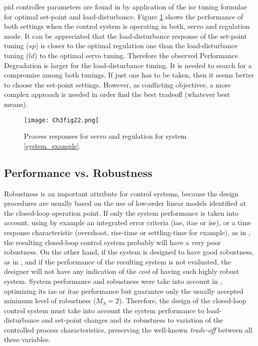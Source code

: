 \gls{pid} controller parameters are found in \citet{zhuang1993} by application of the \gls{ise} tuning formulae for optimal set-point and load-disturbance. Figure \ref{ch3:fig:example1} shows the performance of both settings when the control system is operating in both, servo and regulation mode. It can be appreciated that the load-disturbance response of the set-point tuning ($sp$) is closer to the optimal regulation one than the load-disturbance tuning ($ld$) to the optimal servo tuning. Therefore the observed Performance Degradation is larger for the load-disturbance tuning. It is needed to search for a compromise among both tunings. If just one has to be taken, then it seems better to choose the set-point settings. However, as conflicting objectives, a more complex approach is needed in order find the best tradeoff (whatever best means).
%
\begin{figure}[tb]
    \begin{center}
        \texttt{[image: Ch3fig22.png]}
        \caption{Process responses for servo and regulation for system \ref{system_example}.}
        \label{ch3:fig:example1}
    \end{center}
\end{figure}
%
%
\subsection{Performance vs. Robustness}
%
Robustness is an important attribute for control systems, because the design procedures are usually based on the use of low-order linear models identified at the closed-loop operation point. If only the system performance is taken into account, using by example an integrated error criteria (\gls{iae}, \gls{itae} or \gls{ise}), or a time response characteristic (overshoot, rise-time or settling-time for example), as in \cite{Huang2002, Tavakoli2003}, the resulting closed-loop control system probably will have a very poor robustness.  On the other hand, if the system is designed to have good robustness, as in \cite{Hagglund2008}, and if the performance of the resulting system is not evaluated, the designer will not have any indication of the \emph{cost} of having such highly robust system.  System performance and robustness were take into account in \cite{Shen2002, Tavakoli2005}, optimizing its \gls{iae} or \gls{itae} performance but guarantee only the usually accepted minimum level of robustness ($M_S=2$). Therefore, the design of the closed-loop control system must take into account the system performance to load-disturbance and set-point changes and its robustness to variation of the controlled process characteristics, preserving the well-known \emph{trade-off} between all these variables.

